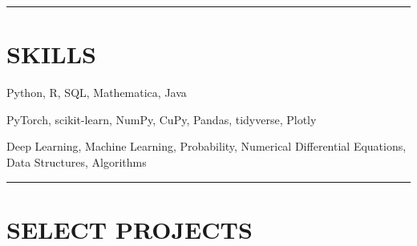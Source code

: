 \documentclass{simplecv}
\begin{document}
\rule{10cm}{0.5pt}

\vspace{-0.4cm}


\section{SKILLS}
 Python, R, SQL, Mathematica, Java

 PyTorch, scikit-learn, NumPy, CuPy, Pandas, tidyverse, Plotly

 Deep Learning, Machine Learning, Probability, Numerical Differential Equations, Data Structures, Algorithms

\vspace{-0.2cm}

\rule{10cm}{0.5pt}

\vspace{-0.4cm}

\section{SELECT PROJECTS}
\end{document}
